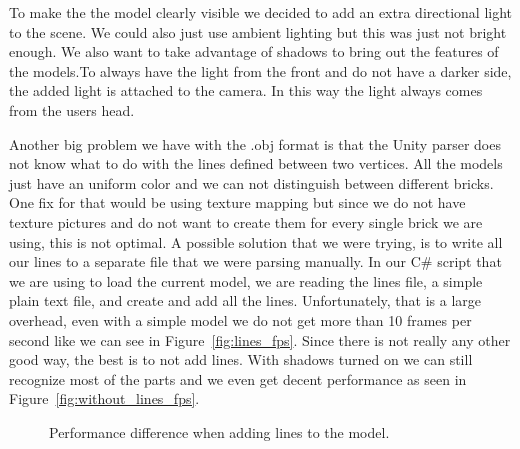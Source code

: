 \begin{description}[align=left]
	\newpage
	
	\item [Lighting]
	To make the the model clearly visible we decided to add an extra directional light to the scene. We could also just use ambient lighting but this was just not bright enough. We also want to take advantage of shadows to bring out the features of the models.\newline To always have the light from the front and do not have a darker side, the added light is attached to the camera. In this way the light always comes from the users head. 
	
	\item [Lines]
	Another big problem we have with the .obj format is that the Unity parser does not know what to do with the lines defined between two vertices. All the models just have an uniform color and we can not distinguish between different bricks. \newline 
	One fix for that would be using texture mapping but since we do not have texture pictures and do not want to create them for every single brick we are using, this is not optimal. A possible solution that we were trying, is to write all our lines to a separate file that we were parsing manually. In our C\# script that we are using to load the current model, we are reading the lines file, a simple plain text file, and create and add all the lines. Unfortunately, that is a large overhead, even with a simple model we do not get more than 10 frames per second like we can see in Figure~\ref{fig:lines_fps}. Since there is not really any other good way, the best is to not add lines. With shadows turned on we can still recognize most of the parts and we even get decent performance as seen in Figure~\ref{fig:without_lines_fps}.
	
	\begin{figure}[!ht]
		\captionsetup{justification=centering}
		\centering
		\hfill
		\hfill
		\caption{Performance difference when adding lines to the model.}
		\label{fig:lines_performance}
	\end{figure}


\end{description}

